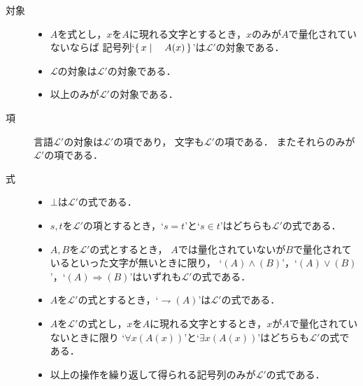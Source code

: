 	\begin{description}
		\item[対象]
			\begin{itemize}
				\item $A$を式とし，$x$を$A$に現れる文字とするとき，$x$のみが$A$で量化されていないならば
					記号列`$\left\{\, x \mid \quad A(x)\, \right\}$'は$\mathcal{L}'$の対象である．
					
				\item $\mathcal{L}$の対象は$\mathcal{L}'$の対象である．
				
				\item 以上のみが$\mathcal{L}'$の対象である．
			\end{itemize}
			
		\item[項] 言語$\mathcal{L}'$の対象は$\mathcal{L}'$の項であり，
			文字も$\mathcal{L}'$の項である．
			またそれらのみが$\mathcal{L}'$の項である．
	
		\item[式] 
			\begin{itemize}
				\item $\bot$は$\mathcal{L}'$の式である．
				
				\item $s,t$を$\mathcal{L}'$の項とするとき，`$s=t$'と`$s \in t$'はどちらも$\mathcal{L}'$の式である．
					
				\item $A,B$を$\mathcal{L}'$の式とするとき，
					$A$では量化されていないが$B$で量化されているといった文字が無いときに限り，
					`$(A) \wedge (B)$'，`$(A) \vee (B)$'，`$(A) \Longrightarrow (B)$'はいずれも$\mathcal{L}'$の式である．
				
				\item $A$を$\mathcal{L}'$の式とするとき，`$\rightharpoondown (A)$'は$\mathcal{L}'$の式である．
				
				\item $A$を$\mathcal{L}'$の式とし，$x$を$A$に現れる文字とするとき，$x$が$A$で量化されていないときに限り
					`$\forall x (A(x))$'と`$\exists x (A(x))$'はどちらも$\mathcal{L}'$の式である．
				
				\item 以上の操作を繰り返して得られる記号列のみが$\mathcal{L}'$の式である．
			\end{itemize}
	\end{description}
	
	
